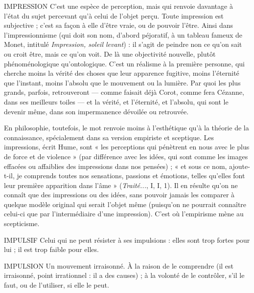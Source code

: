 IMPRESSION C’est une espèce de perception, mais qui renvoie davantage
à l’état du sujet percevant qu’à celui de l’objet perçu. Toute
impression est subjective ; c’est sa façon à elle d’être vraie, ou de pouvoir l'être.
Ainsi dans l’impressionnisme (qui doit son nom, d’abord péjoratif, à un
tableau fameux de Monet, intitulé {\it Impression, soleil levant}) : il s’agit de peindre
non ce qu’on sait ou croit être, mais ce qu’on voit. De là une objectivité nouvelle,
plutôt phénoménologique qu’ontologique. C’est un réalisme à la première personne,
qui cherche moins la vérité des choses que leur apparence fugitive,
moins l’éternité que l’instant, moins l’absolu que le mouvement ou la
lumière. Par quoi les plus grands, parfois, retrouveront — comme faisait déjà
Corot, comme fera Cézanne, dans ses meilleurs toiles — et la vérité, et l’éternité,
et l’absolu, qui sont le devenir même, dans son impermanence dévoilée ou
retrouvée.

En philosophie, toutefois, le mot renvoie moins à l'esthétique qu’à la
théorie de la connaissance, spécialement dans sa version empiriste et sceptique.
Les impressions, écrit Hume, sont « les perceptions qui pénètrent en nous avec
le plus de force et de violence » (par différence avec les idées, qui sont comme
les images effacées ou affaiblies des impressions dans nos pensées) ; « et sous ce
nom, ajoute-t-il, je comprends toutes nos sensations, passions et émotions,
telles qu’elles font leur première apparition dans l’âme » ({\it Traité...}, I, I, 1). Il en
résulte qu’on ne connaît que des impressions ou des idées, sans pouvoir jamais
les comparer à quelque modèle original qui serait l’objet même (puisqu'on ne
pourrait connaître celui-ci que par l'intermédiaire d’une impression). C’est où
l’empirisme mène au scepticisme.

IMPULSIF Celui qui ne peut résister à ses impulsions : elles sont trop fortes
pour lui ; il est trop faible pour elles.

IMPULSION Un mouvement irraisonné. À la raison de le comprendre (il
est irraisonné, point irrationnel : il a des causes) ; à la volonté
de le contrôler, s’il le faut, ou de l’utiliser, si elle le peut.

